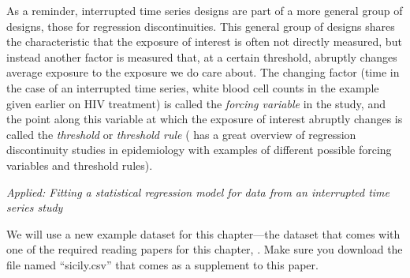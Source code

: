 \documentclass[
]{book}
\begin{document}
As a reminder, interrupted time series designs are part of a more general group of designs, those for regression discontinuities. This general group of designs shares the characteristic that the exposure of interest is often not directly measured, but instead another factor is measured that, at a certain threshold, abruptly changes average exposure to the exposure we do care about. The changing factor (time in the case of an interrupted time series, white blood cell counts in the example given earlier on HIV treatment) is called the \emph{forcing variable} in the study, and the point along this variable at which the exposure of interest abruptly changes is called the \emph{threshold} or \emph{threshold rule} (\citep{bor2014regression} has a great overview of regression discontinuity studies in epidemiology with examples of different possible forcing variables and threshold rules).

\emph{Applied: Fitting a statistical regression model for data from an interrupted time series study}

We will use a new example dataset for this chapter---the dataset that comes with one of the required reading papers for this chapter, \citet{bernal2017interrupted}. Make sure you download the file named ``sicily.csv'' that comes as a supplement to this paper.
\end{document}
